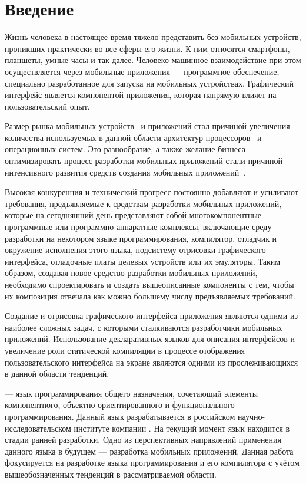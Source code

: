 \section*{Введение}
Жизнь человека в настоящее время тяжело представить без мобильных устройств,
проникших практически во все сферы его жизни.
К ним относятся смартфоны, планшеты, умные часы и так далее.
Человеко-машинное взаимодействие при этом осуществляется через мобильные
приложения --- программное обеспечение, специально разработанное для
запуска на мобильных устройствах. Графический интерфейс является
компонентой приложения, которая напрямую влияет на пользовательский опыт.

Размер рынка мобильных устройств~\cite{device-market-stat} и
приложений стал причиной увеличения количества используемых
в данной области архитектур
процессоров~\cite{cpu-arches, mobile-phones-cpu-trends} и
операционных систем. Это разнообразие, а также желание бизнеса
оптимизировать процесс разработки мобильных приложений
стали причиной интенсивного развития средств создания мобильных
приложений~\cite{mob-apps-approaches,kotlin-homepage,swift-homepage,flutter-homepage, reactnative-homepage, vuenative-homepage}.

Высокая конкуренция и технический прогресс постоянно добавляют
и усиливают требования, предъявляемые к средствам разработки мобильных
приложений, которые на сегодняшний день представляют собой
многокомпонентные программные или программно-аппарат\-ные комплексы,
включающие среду разработки на некотором языке программирования,
компилятор, отладчик и окружение исполнения этого языка, подсистему
отрисовки графического интерфейса, отладочные платы целевых устройств
или их эмуляторы.
Таким образом, создавая новое средство разработки мобильных
приложений, необходимо спроектировать и создать вышеописанные
компоненты с тем, чтобы их композиция отвечала как можно большему
числу предъявляемых требований.

Создание и отрисовка графического интерфейса приложения являются одними
из наиболее сложных задач, с которыми сталкиваются разработчики
мобильных приложений. Использование декларативных языков для описания
интерфейсов и увеличение роли статической компиляции в процессе отображения
пользовательского интерфейса на экране являются одними из прослеживающихся
в данной области тенденций.

 --- язык программирования общего назначения, сочетающий
элементы компонентного, объектно-ориентированного и функционального
программирования. Данный язык разрабатывается в российском
научно-исследовательском институте компании . На текущий момент
язык находится в стадии ранней разработки. Одно из перспективных
направлений применения данного языка в будущем --- разработка мобильных
приложений. Данная работа фокусируется на разработке языка программирования
 и его компилятора с учётом вышеобозначенных тенденций
в рассматриваемой области.
